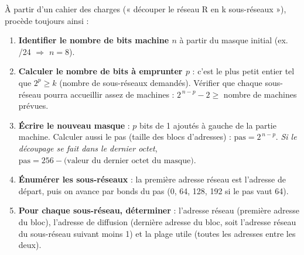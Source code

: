 \documentclass[11pt]{article}
\newcommand{\cle}[1]{{\popxbold\color{popdark}#1}}
\begin{document}
\begin{methode}
À partir d'un cahier des charges (« découper le réseau R en k sous-réseaux »), procède toujours ainsi :
\begin{enumerate}
\item \textbf{Identifier le nombre de bits machine $n$} à partir du masque initial (ex. /24 $\Rightarrow$ $n = 8$).
\item \textbf{Calculer le nombre de bits à emprunter $p$} : c'est le plus petit entier tel que $2^p \geq k$ (nombre de sous-réseaux demandés). Vérifier que chaque sous-réseau pourra accueillir assez de machines : $2^{\,n-p} - 2 \geq$ nombre de machines prévues.
\item \textbf{Écrire le nouveau masque} : $p$ bits de 1 ajoutés à gauche de la partie machine. Calculer aussi le \cle{pas} (taille des blocs d'adresses) : $\text{pas} = 2^{\,n-p}$. \emph{Si le découpage se fait dans le dernier octet}, $\text{pas} = 256 - \text{(valeur du dernier octet du masque)}$.
\item \textbf{Énumérer les sous-réseaux} : la première adresse réseau est l'adresse de départ, puis on avance par bonds du pas (0, 64, 128, 192 si le pas vaut 64).
\item \textbf{Pour chaque sous-réseau, déterminer} : l'adresse réseau (première adresse du bloc), l'adresse de diffusion (dernière adresse du bloc, soit l'adresse réseau du sous-réseau suivant moins 1) et la plage utile (toutes les adresses entre les deux).
\end{enumerate}
\end{methode}
\end{document}
